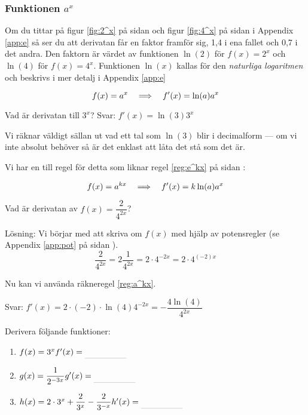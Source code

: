\documentclass[a4paper, 12pt]{article}
\begin{document}
\subsubsection{Funktionen $a^x$}
Om du tittar på figur \ref*{fig:2^x} på sidan \pageref*{fig:2^x} och figur \ref*{fig:4^x} på sidan \pageref*{fig:4^x} i Appendix \ref*{app:e} så ser du att derivatan får en faktor framför sig, 1,4 i ena fallet och 0,7 i det andra. Den faktorn är värdet av funktionen $\ln(2)$ för $f(x) = 2^x$ och $\ln(4)$ för $f(x) = 4^x$. Funktionen $\ln (x)$ kallas för den \emph{naturliga logaritmen} och beskrivs i mer detalj i Appendix \ref*{app:e}


\begin{regel}
    \label{reg:a^x}
    \[f(x) = a^x \hspace{1em} \Longrightarrow \hspace{1em} f'(x) = \ln (a) a^x \]
\end{regel}


\begin{exempel}
    \label{ex:a^x}
    Vad är derivatan till $3^x$?
    Svar: $f'(x) = \ln (3) 3^x$
\end{exempel}

Vi räknar väldigt sällan ut vad ett tal som $\ln(3)$ blir i decimalform --- om vi inte absolut behöver så är det enklast att låta det stå som det är.

Vi har en till regel för detta som liknar regel \ref*{reg:e^kx} på sidan \pageref*{reg:e^kx}:

\begin{regel}
    \label{reg:a^kx}
    \[f(x) = a^{kx} \hspace{1em} \Longrightarrow \hspace{1em} f'(x) = k\ln(a)a^x\]
\end{regel}


\begin{exempel}
    Vad är derivatan av $f(x) = \dfrac 2{4^{2x}}$?
    
    Lösning: Vi börjar med att skriva om $f(x)$ med hjälp av potensregler (se Appendix \ref*{app:pot} på sidan \pageref*{app:pot}).
    \[\dfrac{2}{4^{2x}} = 2\dfrac{1}{4^{2x}} = 2\cdot 4^{-2x} = 2\cdot 4^{(-2)x}\]

    Nu kan vi använda räkneregel \ref*{reg:a^kx}.

    Svar: $f'(x) = 2\cdot (-2) \cdot \ln(4) 4^{-2x} = - \dfrac {4\ln(4)} {4^{2x}}$
\end{exempel}

\begin{uppgifter}
    \label{upp:a^kx}
    Derivera följande funktioner:
    \begin{multicols}{3}
        \begin{enumerate}
            \item $f(x) = 3^x \\ f'(x) \ans$
            \item $g(x) = \dfrac{1}{2^{-3x}} \\ g'(x) \ans$
            \item $h(x) = 2\cdot 3^x + \dfrac 2{3^x} - \dfrac 2{3^{-x}} \\ h'(x) \ans$
        \end{enumerate}
    \end{multicols}
\end{uppgifter}
\end{document}
